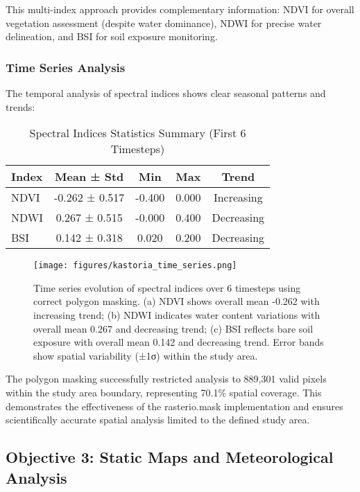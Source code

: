 \documentclass[a4paper,12pt]{article}
\begin{document}
This multi-index approach provides complementary information: NDVI for overall
vegetation assessment (despite water dominance), NDWI for precise water
delineation, and BSI for soil exposure monitoring.

\subsubsection{Time Series Analysis}

The temporal analysis of spectral indices shows clear seasonal patterns and
trends:

\begin{table}[H]
    \centering
    \caption{Spectral Indices Statistics Summary (First 6 Timesteps)}
    \begin{tabular}{@{}lcccc@{}}
        \toprule
        Index & Mean ± Std     & Min    & Max   & Trend      \\
        \midrule
        NDVI  & -0.262 ± 0.517 & -0.400 & 0.000 & Increasing \\
        NDWI  & 0.267 ± 0.515  & -0.000 & 0.400 & Decreasing \\
        BSI   & 0.142 ± 0.318  & 0.020  & 0.200 & Decreasing \\
        \bottomrule
    \end{tabular}
\end{table}

\begin{figure}[H]
    \centering
    \texttt{[image: figures/kastoria\_time\_series.png]}
    \caption{Time series evolution of spectral indices over 6 timesteps using correct polygon masking. (a) NDVI shows overall mean -0.262 with increasing trend; (b) NDWI indicates water content variations with overall mean 0.267 and decreasing trend; (c) BSI reflects bare soil exposure with overall mean 0.142 and decreasing trend. Error bands show spatial variability (±1σ) within the study area.}
    \label{fig:time_series}
\end{figure}

The polygon masking successfully restricted analysis to 889,301 valid pixels
within the study area boundary, representing 70.1\% spatial coverage. This
demonstrates the effectiveness of the rasterio.mask implementation and ensures
scientifically accurate spatial analysis limited to the defined study area.

\subsection{Objective 3: Static Maps and Meteorological Analysis}
\end{document}

